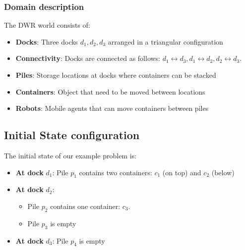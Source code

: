 \documentclass[a4paper]{article}
\theoremstyle{definition}
\begin{document}
\subsubsection{Domain description}
The DWR world consists of:
\begin{itemize}
    \item \textbf{Docks}: Three docks \( d_1, d_2, d_3 \) arranged in a triangular configuration 
    \item \textbf{Connectivity}: Docks are connected as follows: \( d_1 \leftrightarrow d_3, d_1 \leftrightarrow d_2, d_2 \leftrightarrow d_3 \).
    \item \textbf{Piles}: Storage locations at docks where containers can be stacked 
    \item \textbf{Containers}: Object that need to be moved between locations 
    \item \textbf{Robots}: Mobile agents that can move containers between piles 
\end{itemize}
\begin{center}
\end{center}

\subsection{Initial State configuration}
The initial state of our example problem is:
\begin{itemize}
    \item \textbf{At dock} \( d_1 \): Pile \( p_1 \) contains two containers: \( c_1 \) (on top) and \( c_2 \) (below)
    \item \textbf{At dock} \( d_2 \):
    \begin{itemize}
        \item Pile \( p_2 \) contains one container: \( c_3 \).
        \item Pile \( p_3 \) is empty 
    \end{itemize}
    \item \textbf{At dock} \( d_3 \): Pile \( p_4 \) is empty
\end{itemize}
\end{document}
